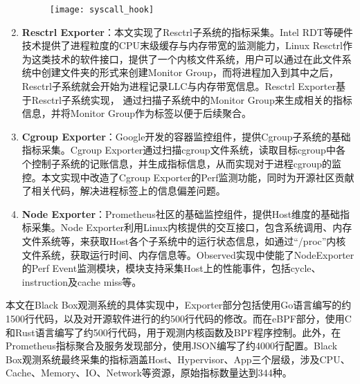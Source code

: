\begin{enumerate}
    \begin{figure}[H]
        \centering
        \texttt{[image: syscall\_hook]}
        \label{fig:syscall_hook}
    \end{figure}

    \item \textbf{Resctrl Exporter}：本文实现了Resctrl子系统的指标采集。Intel RDT等硬件技术提供了进程粒度的CPU末级缓存与内存带宽的监测能力，Linux Resctrl作为这类技术的软件接口，提供了一个内核文件系统，用户可以通过在此文件系统中创建文件夹的形式来创建Monitor Group，而将进程加入到其中之后，Resctrl子系统就会开始为进程记录LLC与内存带宽信息。Resctrl Exporter基于Resctrl子系统实现， 通过扫描子系统中的Monitor Group来生成相关的指标信息，并将Monitor Group作为标签以便于后续聚合。
    
    \item \textbf{Cgroup Exporter}：Google开发的容器监控组件，提供Cgroup子系统的基础指标采集。Cgroup Exporter通过扫描cgroup文件系统，读取目标cgroup中各个控制子系统的记账信息，并生成指标信息，从而实现对于进程cgroup的监控。本文实现中改造了Cgroup Exporter的Perf监测功能，同时为开源社区贡献了相关代码，解决进程标签上的信息偏差问题。
    
    \item \textbf{Node Exporter}：Prometheus社区的基础监控组件，提供Host维度的基础指标采集。Node Exporter利用Linux内核提供的交互接口，包含系统调用、内存文件系统等，来获取Host各个子系统中的运行状态信息，如通过“/proc”内核文件系统，获取运行时间、内存信息等。Observed实现中使能了NodeExporter的Perf Event监测模块，模块支持采集Host上的性能事件，包括cycle、instruction及cache miss等。

\end{enumerate}


本文在Black Box观测系统的具体实现中，Exporter部分包括使用Go语言编写的约1500行代码，以及对开源软件进行的约500行代码的修改。而在eBPF部分，使用C和Rust语言编写了约500行代码，用于观测内核函数及BPF程序控制。此外，在Prometheus指标聚合及服务发现部分，使用JSON编写了约4000行配置。Black Box观测系统最终采集的指标涵盖Host、Hypervisor、App三个层级，涉及CPU、Cache、Memory、IO、Network等资源，原始指标数量达到344种。

